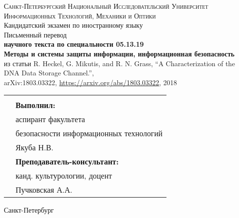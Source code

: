 \begin{titlepage}
  \begin{center}
    \textsc{
      Санкт-Петербургский Национальный Исследовательский Университет\\
      Информационных Технологий, Механики и Оптики}\\
    \vspace{0.25\textheight}
    {\huge Кандидатский экзамен по иностранному языку}\\
    \vspace{0.1\textheight}
    {\Large Письменный перевод}\\[1em]
    \textbf{
      научного текста по специальности 05.13.19\\
      Методы и системы защиты информации, информационная безопасность}\\
    из статьи R. Heckel, G. Mikutis, and R. N. Grass, ``A Characterization of the DNA Data Storage Channel.'',\\
    arXiv:1803.03322, \url{https://arxiv.org/abs/1803.03322}, 2018\\[3em]
    \begin{tabular}{ll}
      \hspace*{0.5\textwidth}&\\
      &\textbf{Выполнил:}\\
      &аспирант факультета\\
      &безопасности информационных технологий\\
      &Якуба Н.В.\\[1em]
      &\textbf{Преподаватель-консультант:}\\
      &канд. культурологии, доцент\\
      &Пучковская А.А.
    \end{tabular}
    \vfill
    Санкт-Петербург\\
    \the\year 
  \end{center}
\end{titlepage}

